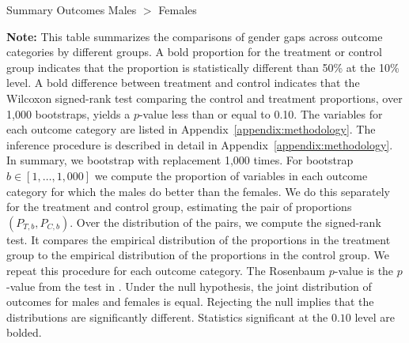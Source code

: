 


\newcommand*\leftright[2]{%
  \leavevmode
  \rlap{#1}%
  \hspace{0.5\linewidth}%
  #2}

\newcommand{\orth}{\ensuremath{\perp\!\!\!\perp}}%
\newcommand{\indep}{\orth}%
\newcommand{\notorth}{\ensuremath{\perp\!\!\!\!\!\!\diagup\!\!\!\!\!\!\perp}}%
\newcommand{\notindep}{\notorth}





\begin{sidewaystable}[!htbp]
\centering
\begin{threeparttable}
\caption{Summary Outcomes Males $>$ Females}
 \label{tab:proportion-table-ranksign}
 
 \begin{tablenotes}
 \footnotesize
\item \textbf{Note:} This table summarizes the comparisons of gender gaps across outcome categories by different groups. A bold proportion for the treatment or control group indicates that the proportion is statistically different than 50\% at the 10\% level. A bold difference between treatment and control indicates that the Wilcoxon signed-rank test comparing the control and treatment proportions, over 1,000 bootstraps, yields a $p$-value less than or equal to 0.10. The variables for each outcome category are listed in Appendix~\ref{appendix:methodology}. The inference procedure is described in detail in Appendix~\ref{appendix:methodology}. In summary, we bootstrap with replacement 1,000 times. For bootstrap $b \in [1, \ldots, 1,000]$ we compute the proportion of variables in each outcome category for which the males do better than the females. We do this separately for the treatment and control group, estimating the pair of proportions $(P_{T,b}, P_{C,b})$. Over the distribution of the pairs, we compute the signed-rank test. It compares the empirical distribution of the proportions in the treatment group to the empirical distribution of the proportions in the control group. We repeat this procedure for each outcome category. The Rosenbaum $p$-value is the $p$-value from the test in  \citet{Rosenbaum_2005_Distribution_JRSS}. Under the null hypothesis, the joint distribution of outcomes for males and females is equal. Rejecting the null implies that the distributions are significantly different. Statistics significant at the $0.10$ level are bolded.
\end{tablenotes}
\end{threeparttable}
\end{sidewaystable}

